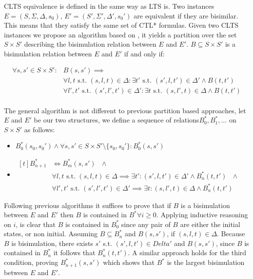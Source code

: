CLTS equivalence is defined in the same way as LTS is. Two instances $E =  (S, \Sigma, \Delta, s_0)$,
$E' =  (S', \Sigma', \Delta', s_0')$ are equivalent if they are bisimilar. This means that they satisfy the same set of CTL* formulas. Given two CLTS instances we propose an algorithm based on \cite{paige1987three}, it yields a partition over the set $S \times S'$ describing the bisimulation relation between $E$ and $E'$.
$B \subseteq S \times S'$ is a bisimulation relation between $E$ and $E'$ if and only if:

\[\begin{aligned}
	\forall s, s' \in S \times S': & B(s,s') \implies \\
	&\forall l,t \text{ s.t. } (s,l,t) \in \Delta  :\exists t' \text{ s.t. } (s',l,t') \in \Delta' \wedge B(t,t')\\
	&\forall l',t' \text{ s.t. } (s',l',t') \in \Delta' :\exists t \text{ s.t. } (s,l',t) \in \Delta \wedge B(t,t')\\	
\end{aligned}\]

The general algorithm is not different to previous partition based approaches, let $E$ and $E'$ be our two structures, we define a sequence of relations$B_0^*,B_1^*,\ldots$ on $S \times S'$ as follows:

\begin{itemize}
	\item $B_0^*(s_0,s_0') \wedge \forall s,s' \in S \times S' \setminus \{s_0,s_0'\}: B_0^*(s,s')$
	\item $\begin{aligned}[t]
	B_{n+1}^*& \iff B_m^*(s,s') \text{ } \wedge\\
		&\forall l,t \text{ s.t. }(s,l,t) \in \Delta \implies \exists t':(s',l,t') \in \Delta' \wedge B_n^*(t,t') \text{ } \wedge\\
		&\forall l',t' \text{ s.t. }(s',l',t') \in \Delta' \implies \exists t:(s,l',t) \in \Delta \wedge B_n^*(t,t')\end{aligned}$
\end{itemize}

Following previous algorithms it suffices to prove that if $B$ is a bisimulation between $E$ and $E'$ then $B$ is contained in $B^* \forall i \geq 0$.  Applying inductive reasoning on $i$, is clear that $B$ is contained in $B_0^*$ since any pair of $B$ are either the initial states, or non initial. Assuming 
$B \subseteq B_n^*$ and $B(s,s')$, if $(s,l,t) \in \Delta$. Because $B$ is bisimulation, there exists $s'$ s.t. $(s',l,t') \in Delta'$ and $B(s,s')$, since $B$ is contained in $B_n^*$ it follows that $B_n^*(t,t')$.
A similar approach holds for the third condition, proving $B_{n+1}^*(s,s')$ which shows that $B^*$ is the largest bisimulation between $E$ and $E'$.

